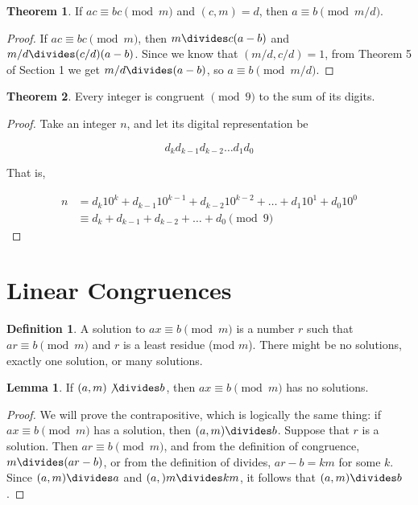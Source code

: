 \documentclass{article}
\theoremstyle{definition} %
\newtheorem{theorem}{Theorem}[section] %
\theoremstyle{definition}
\theoremstyle{definition}
\newtheorem{lemma}{Lemma}[section]
\theoremstyle{definition}
\newtheorem{definition}{Definition}[section]
\begin{document}
  \begin{theorem}
    If $ac \equiv bc \pmod{m}$ and $(c, m) = d$, then $a \equiv b \pmod{m/d}$.
  \end{theorem}
  
  \begin{proof}
    If $ac \equiv bc \pmod{m}$, then $m \divides c(a - b)$ and $m/d \divides (c/d)(a - b)$.
    Since we know that $(m/d, c/d) = 1$, from Theorem 5 of Section 1 we get $m/d \divides (a - b)$,
    so $a \equiv b \pmod{m/d}$.
  \end{proof}
  
  \begin{theorem}
    Every integer is congruent $\pmod{9}$ to the sum of its digits.
  \end{theorem}
  
  \begin{proof}
    Take an integer $n$, and let its digital representation be

    \[ d_kd_{k-1}d_{k-2}\dots d_1d_0 \]

    That is,
    
    \begin{align*}
      n &= d_k10^k + d_{k-1}10^{k-1} + d_{k-2}10^{k-2} + \dots + d_1 10^1 + d_0 10^0 \\
        &\equiv d_k + d_{k-1} + d_{k-2} + \dots + d_0 \pmod{9}
    \end{align*}
  \end{proof}
  
  \section{Linear Congruences}
  
  \begin{definition}
    A solution to $ax \equiv b \pmod{m}$ is a number $r$ such that $ar \equiv b \pmod{m}$
    and $r$ is a least residue (mod $m$). There might be no solutions, exactly one solution,
    or many solutions.
  \end{definition}
  
  \begin{lemma}
    If $(a, m) \not\divides b$, then $ax \equiv b \pmod{m}$ has no solutions.
  \end{lemma}
  
  \begin{proof}
    We will prove the contrapositive, which is logically the same thing: if $ax \equiv b \pmod{m}$
    has a solution, then $(a, m) \divides b$. Suppose that $r$ is a solution. Then $ar \equiv b \pmod{m}$,
    and from the definition of congruence, $m \divides (ar - b)$, or from the definition of divides,
    $ar - b = km$ for some $k$. Since $(a, m) \divides a$ and $(a, )m \divides km$, it follows that
    $(a, m) \divides b$.
  \end{proof}
  
\end{document}
